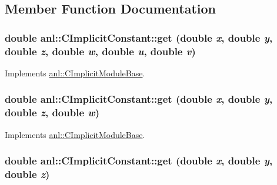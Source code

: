 \subsection{Member Function Documentation}
\hypertarget{classanl_1_1CImplicitConstant_a9f07f5043ff85ae39e0e484887a070d1}{
\subsubsection[{get}]{\setlength{\rightskip}{0pt plus 5cm}double anl::CImplicitConstant::get (double {\em x}, \/  double {\em y}, \/  double {\em z}, \/  double {\em w}, \/  double {\em u}, \/  double {\em v})}}
\label{classanl_1_1CImplicitConstant_a9f07f5043ff85ae39e0e484887a070d1}


Implements \hyperlink{classanl_1_1CImplicitModuleBase_aa40b7d54572197612a4fea44b63447eb}{anl::CImplicitModuleBase}.\hypertarget{classanl_1_1CImplicitConstant_a90c57419a55ae0914447f7bf325ca27e}{
\subsubsection[{get}]{\setlength{\rightskip}{0pt plus 5cm}double anl::CImplicitConstant::get (double {\em x}, \/  double {\em y}, \/  double {\em z}, \/  double {\em w})}}
\label{classanl_1_1CImplicitConstant_a90c57419a55ae0914447f7bf325ca27e}


Implements \hyperlink{classanl_1_1CImplicitModuleBase_a3cf520bdab59631864253c03b4e1723f}{anl::CImplicitModuleBase}.\hypertarget{classanl_1_1CImplicitConstant_a92a9154b9dee96b7c01637d9b8f879de}{
\subsubsection[{get}]{\setlength{\rightskip}{0pt plus 5cm}double anl::CImplicitConstant::get (double {\em x}, \/  double {\em y}, \/  double {\em z})}}
\label{classanl_1_1CImplicitConstant_a92a9154b9dee96b7c01637d9b8f879de}


